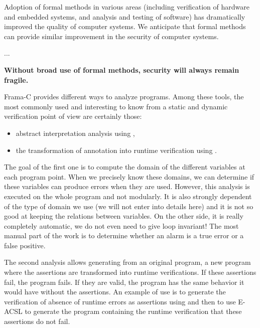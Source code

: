 \begin{Quotation}
Adoption of formal methods in various areas (including verification of hardware
and embedded systems, and analysis and testing of software) has dramatically
improved the quality of computer systems.  We anticipate that formal methods
can provide similar improvement in the security of computer systems.

...

\textbf{Without broad use of formal methods, security will always remain fragile.}
\end{Quotation}







Frama-C provides different ways to analyze programs. Among these tools, the
most commonly used and interesting to know from a static and dynamic
verification point of view are certainly those:
\begin{itemize}
\item abstract interpretation analysis using
,
\item the transformation of annotation into runtime verification using
.
\end{itemize}

The goal of the first one is to compute the domain of the different
variables at each program point. When we precisely know these domains,
we can determine if these variables can produce errors when they are
used. However, this analysis is executed on the whole program and not
modularly. It is also strongly dependent of the type of domain we use (we
will not enter into details here) and it is not so good at keeping the
relations between variables. On the other side, it is really completely
automatic, we do not even need to give loop invariant! The most manual
part of the work is to determine whether an alarm is a true error
or a false positive.

The second analysis allows generating from an original program, a new
program where the assertions are transformed into runtime verifications.
If these assertions fail, the program fails. If they are valid, the
program has the same behavior it would have without the assertions. An
example of use is to generate the verification of absence of runtime
errors as assertions using  and then to use E-ACSL to
generate the program containing the runtime verification that these
assertions do not fail.

